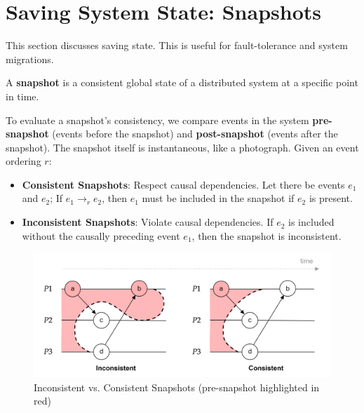 \section{Saving System State: Snapshots}

\label{sec:snap}
This section discusses saving state. This is useful for fault-tolerance and system migrations.

\begin{Def}[Snapshot]
    
    \label{def:snapshot}
    A \textbf{snapshot} is a consistent global state of a distributed system at a specific point in time. 
\end{Def}

\begin{Def}

    To evaluate a snapshot's consistency, we compare events in the system \textbf{pre-snapshot} (events before the snapshot) 
    and \textbf{post-snapshot} (events after the snapshot). The snapshot itself is instantaneous, like a photograph. 
    Given an event ordering $r$:
    
    \begin{itemize}
        \item \textbf{Consistent Snapshots}: Respect causal dependencies. Let there be events $e_1$ and $e_2$; If $e_1 \rightarrow_r e_2$, then $e_1$ must be included in the snapshot if $e_2$ is present.
        \item \textbf{Inconsistent Snapshots}: Violate causal dependencies. If $e_2$ is included without 
        the causally preceding event $e_1$, then the snapshot is inconsistent.
    \end{itemize}
\end{Def}

\vspace{-1em}
\begin{figure}[h]
    \centering
    \includegraphics[width=.9\textwidth]{Sections/snap/snap.png}
    \caption{Inconsistent vs. Consistent Snapshots (pre-snapshot highlighted in red)}
\end{figure}

